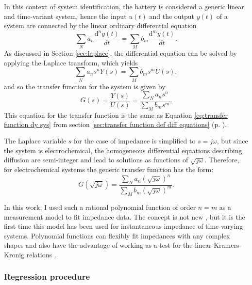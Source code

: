 In this context of system identification, the battery is considered a generic linear and time-variant system, hence the input $u(t)$ and the output $y(t)$ of a system are connected by the linear ordinary differential equation
\begin{equation}
    \sum_{N} a_n \frac{\text{d}^ny(t)}{dt} = \sum_{M} b_m \frac{\text{d}^my(t)}{dt}.
\end{equation}
As discussed in Section \ref{sec:laplace}, the differential equation can be solved by applying the Laplace transform, which yields
\begin{equation}
    \sum_{N} a_n s^n Y(s) = \sum_{M} b_m s^m U(s),
\end{equation}
and so the transfer function for the system is given by
\begin{equation}
    G(s) = \frac{Y(s)}{U(s)}=\frac{\sum_{N} a_n s^n}{\sum_{M} b_m s^m}.
\end{equation}
This equation for the transfer function is the same as Equation \ref{eq:transfer function dy sys} from section \ref{sec:transfer function def diff equations} (p. \pageref{sec:transfer function def diff equations}).

The Laplace variable $s$ for the case of impedance is simplified to $s = j\omega$, but since the system is electrochemical, the homogeneous differential equations describing diffusion are semi-integer \cite{oldhamFractionalDifferentialEquations2010} and lead to solutions as functions of $\sqrt{j\omega}$.
Therefore, for electrochemical systems the generic transfer function has the form:
\begin{equation}
    G(\sqrt{j\omega}) = \frac{\sum_{N} a_n (\sqrt{j\omega})^n}{\sum_{M} b_m (\sqrt{j\omega})^m}.
    \label{eq:general rational polynomial}
\end{equation}

In this work, I used such a rational polynomial function of order $n=m$ as a measurement model to fit impedance data.
The concept is not new \cite{zoltowskiNontraditionalApproachMeasurement2005,gheemTheoreticalApproachModelling2008a,liModelReductionFractional2024}, but it is the first time this model has been used for instantaneous impedance of time-varying systems.
Polynomial functions can flexibly fit impedances with any complex shapes and also have the advantage of working as a test for the linear Kramers-Kronig relations \cite{sadkowskiCNLSFitsKramers2004}.

\subsubsection{Regression procedure}

